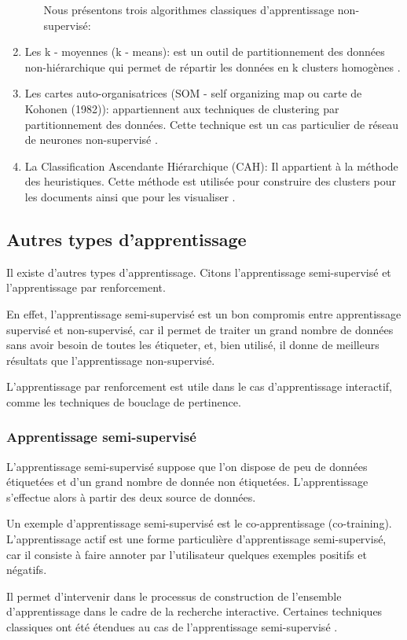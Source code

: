 \documentclass[12pt]{article}
\begin{document}
\begin{enumerate}
\begin{enumerate}
Nous présentons trois algorithmes classiques d'apprentissage non-supervisé:
\end{enumerate}
		\item Les k - moyennes (k - means): est un outil de partitionnement des données non-hiérarchique qui permet de répartir les données en k clusters homogènes \cite{5}.
	\item Les cartes auto-organisatrices (SOM - self organizing map ou carte de Kohonen (1982)): appartiennent aux techniques de clustering par partitionnement des données. Cette technique est un cas particulier de réseau de neurones non-supervisé \cite{6}.
	\item La Classification Ascendante Hiérarchique (CAH): Il appartient à la méthode des heuristiques. Cette méthode est utilisée pour construire des clusters pour les documents ainsi que pour les visualiser \cite{7}.
\end{enumerate}
\subsection{Autres types d'apprentissage}
Il existe d'autres types d'apprentissage. Citons l'apprentissage semi-supervisé et l'apprentissage par renforcement.

En effet, l'apprentissage semi-supervisé est un bon compromis entre apprentissage supervisé et non-supervisé, car il permet de traiter un grand nombre de données sans avoir besoin de toutes les étiqueter, et, bien utilisé, il donne de meilleurs résultats que l'apprentissage non-supervisé.

L'apprentissage par renforcement est utile dans le cas d'apprentissage interactif, comme les techniques de bouclage de pertinence.
\subsubsection{Apprentissage semi-supervisé}
L’apprentissage semi-supervisé suppose que l’on dispose de peu de données étiquetées et d’un grand nombre de donnée non étiquetées. L’apprentissage s’effectue alors à partir des deux source de données.
	
Un exemple d'apprentissage semi-supervisé est le co-apprentissage (co-training). L'apprentissage actif est une forme particulière d'apprentissage semi-supervisé, car il consiste à faire annoter par l'utilisateur quelques exemples positifs et négatifs.
	
Il permet d'intervenir dans le processus de construction de l'ensemble d'apprentissage dans le cadre de la recherche interactive. Certaines techniques classiques ont été étendues au cas de l'apprentissage semi-supervisé \cite{8}.
\end{document}
